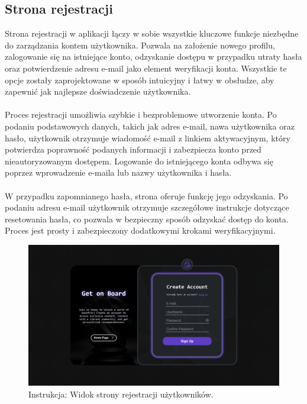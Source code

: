 \documentclass[12pt,a4paper]{article}
\begin{document}
\newpage

\subsection{Strona rejestracji}

\noindent
Strona rejestracji w aplikacji łączy w sobie wszystkie kluczowe funkcje niezbędne do zarządzania kontem użytkownika. Pozwala na założenie nowego profilu, zalogowanie się na istniejące konto, odzyskanie dostępu w przypadku utraty hasła oraz potwierdzenie adresu e-mail jako element weryfikacji konta. Wszystkie te opcje zostały zaprojektowane w sposób intuicyjny i łatwy w obsłudze, aby zapewnić jak najlepsze doświadczenie użytkownika.
\\\\
Proces rejestracji umożliwia szybkie i bezproblemowe utworzenie konta. Po podaniu podstawowych danych, takich jak adres e-mail, nawa użytkownika oraz hasło, użytkownik otrzymuje wiadomość e-mail z linkiem aktywacyjnym, który potwierdza poprawność podanych informacji i zabezpiecza konto przed nieautoryzowanym dostępem. Logowanie do istniejącego konta odbywa się poprzez wprowadzenie e-maila lub nazwy użytkownika i hasła.
\\\\
W przypadku zapomnianego hasła, strona oferuje funkcję jego odzyskania. Po podaniu adresu e-mail użytkownik otrzymuje szczegółowe instrukcje dotyczące resetowania hasła, co pozwala w bezpieczny sposób odzyskać dostęp do konta. Proces jest prosty i zabezpieczony dodatkowymi krokami weryfikacyjnymi.

\vspace{0.5cm}
\begin{figure}[h!]
    \centering
    \includegraphics[width=1\textwidth]{images/ins_reg.png}
    \caption{Instrukcja: Widok strony rejestracji użytkowników.}
\end{figure}
\vspace{0.5cm}
\end{document}

